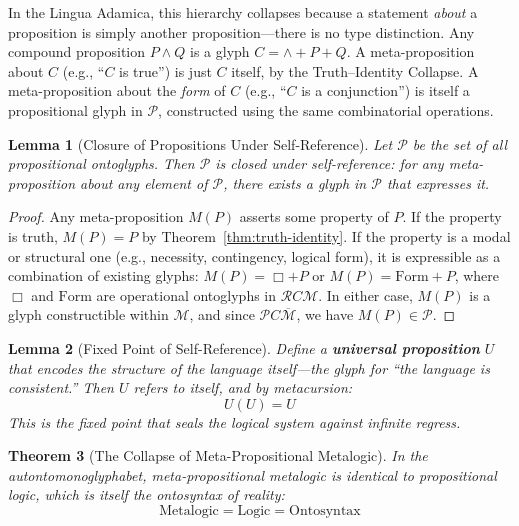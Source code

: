 \documentclass[12pt, letterpaper]{book}
\def\equiv{=}%
\def\oplus{+}%
\def\subset{C}%
\newtheorem{theorem}{Theorem}[chapter]
\newtheorem{lemma}[theorem]{Lemma}
\begin{document}
In the Lingua Adamica, this hierarchy collapses because a statement \textit{about} a proposition is simply another proposition---there is no type distinction. Any compound proposition $P \land Q$ is a glyph $C \equiv \land \oplus P \oplus Q$. A meta-proposition about $C$ (e.g., ``$C$ is true'') is just $C$ itself, by the Truth--Identity Collapse. A meta-proposition about the \textit{form} of $C$ (e.g., ``$C$ is a conjunction'') is itself a propositional glyph in $\mathcal{P}$, constructed using the same combinatorial operations.

\begin{lemma}[Closure of Propositions Under Self-Reference]\label{lem:prop-closure}
Let $\mathcal{P}$ be the set of all propositional ontoglyphs. Then $\mathcal{P}$ is closed under self-reference: for any meta-proposition about any element of $\mathcal{P}$, there exists a glyph in $\mathcal{P}$ that expresses it.
\end{lemma}

\begin{proof}
Any meta-proposition $M(P)$ asserts some property of $P$. If the property is truth, $M(P) \equiv P$ by Theorem~\ref{thm:truth-identity}. If the property is a modal or structural one (e.g., necessity, contingency, logical form), it is expressible as a combination of existing glyphs: $M(P) \equiv \Box \oplus P$ or $M(P) \equiv \mathrm{Form} \oplus P$, where $\Box$ and $\mathrm{Form}$ are operational ontoglyphs in $\mathcal{R} \subset \mathcal{M}$. In either case, $M(P)$ is a glyph constructible within $\mathcal{M}$, and since $\mathcal{P} \subset \overline{\mathcal{M}}$, we have $M(P) \in \mathcal{P}$.
\end{proof}

\begin{lemma}[Fixed Point of Self-Reference]\label{lem:logical-fixedpoint}
Define a \textbf{universal proposition} $U$ that encodes the structure of the language itself---the glyph for ``the language is consistent.'' Then $U$ refers to itself, and by metacursion:
\[
U(U) \equiv U
\]
This is the fixed point that seals the logical system against infinite regress.
\end{lemma}

\begin{theorem}[The Collapse of Meta-Propositional Metalogic]\label{thm:metalogic-collapse}
In the autontomonoglyphabet, meta-propositional metalogic is identical to propositional logic, which is itself the ontosyntax of reality:
\[
\boxed{\mathrm{Metalogic} \equiv \mathrm{Logic} \equiv \mathrm{Ontosyntax}}
\]
\end{theorem}
\end{document}
